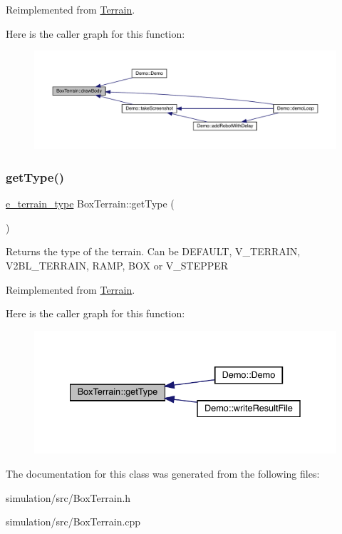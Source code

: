 Reimplemented from \mbox{\hyperlink{class_terrain_ae60571b91c1979fa94bdfc5002da6ac7}{Terrain}}.

Here is the caller graph for this function\+:\nopagebreak
\begin{figure}[H]
\begin{center}
\leavevmode
\includegraphics[width=350pt]{class_box_terrain_a309e67722a008ef166198d36add1690a_icgraph}
\end{center}
\end{figure}
\mbox{\label{class_box_terrain_a8056b743b0cc1fbd38e742f542dfa34b}} 
\subsubsection{\texorpdfstring{get\+Type()}{getType()}}
{\footnotesize\ttfamily \mbox{\hyperlink{_terrain_8h_a6d0b7e83bb7325270c1162bece970fd8}{e\+\_\+terrain\+\_\+type}} Box\+Terrain\+::get\+Type (\begin{DoxyParamCaption}{ }\end{DoxyParamCaption})\hspace{0.3cm}{\ttfamily [virtual]}}

\begin{DoxyReturn}{Returns}
the type of the terrain. Can be D\+E\+F\+A\+U\+LT, V\+\_\+\+T\+E\+R\+R\+A\+IN, V2\+B\+L\+\_\+\+T\+E\+R\+R\+A\+IN, R\+A\+MP, B\+OX or V\+\_\+\+S\+T\+E\+P\+P\+ER 
\end{DoxyReturn}


Reimplemented from \mbox{\hyperlink{class_terrain_a6cd1220b8e64466cc7a2219efff4141b}{Terrain}}.

Here is the caller graph for this function\+:\nopagebreak
\begin{figure}[H]
\begin{center}
\leavevmode
\includegraphics[width=335pt]{class_box_terrain_a8056b743b0cc1fbd38e742f542dfa34b_icgraph}
\end{center}
\end{figure}


The documentation for this class was generated from the following files\+:\begin{DoxyCompactItemize}
\item 
simulation/src/Box\+Terrain.\+h\item 
simulation/src/Box\+Terrain.\+cpp\end{DoxyCompactItemize}
